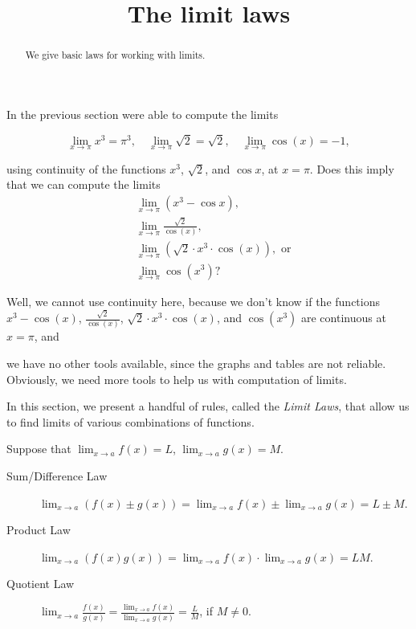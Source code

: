 \documentclass{ximera}
\title[Dig-In:]{The limit laws}
\begin{document}
\begin{abstract}
We give basic laws for working with limits. 
\end{abstract}
\maketitle
In the previous section were able to compute the limits

\[
\lim_{x\to \pi} x^3=\pi^3,\quad\lim_{x\to \pi} \sqrt{2}=\sqrt{2},\quad\lim_{x\to \pi} \cos(x)= -1,
\]

using continuity of the functions $x^3$, $\sqrt{2}$, and $\cos{x}$, at
$x=\pi$.  Does this imply that we can compute the limits
\begin{align*}
  &\lim_{x\to \pi} (x^3-\cos{x}),\\
  &\lim_{x\to \pi} \frac{\sqrt{2}}{\cos(x)},\\
  &\lim_{x\to \pi} (\sqrt{2}\cdot x^3\cdot\cos(x)), \text{ or}\\
  &\lim_{x\to \pi} \cos({x^3})?
\end{align*}

Well, we cannot use continuity here, because we don't know if the
functions $x^3-\cos(x)$, $\frac{\sqrt{2}}{\cos(x)}$, $\sqrt{2}\cdot
x^3\cdot\cos(x)$, and $\cos({x^3})$ are continuous at $x=\pi$, and

 we have no other tools available, since the graphs and tables are not reliable. Obviously, we need more tools to help us with computation of limits.

 

In this section, we present a handful of rules, called the \textit{Limit Laws},
that allow us to find limits of various combinations of functions.

\begin{theorem}\label{theorem:limit-laws}
Suppose that $\lim_{x\to a}f(x)=L$, $\lim_{x\to a}g(x)=M$.
\begin{description}
\item[Sum/Difference Law] $\lim_{x\to a} (f(x) \pm g(x)) =
  \lim_{x\to a}f(x) \pm \lim_{x\to a}g(x)=L \pm M$.
\item[Product Law]  $\lim_{x\to a} (f(x)g(x)) = \lim_{x\to
  a}f(x)\cdot\lim_{x\to a}g(x)=LM$.
\item[Quotient Law]  $\lim_{x\to a} \frac{f(x)}{g(x)} =
  \frac{\lim_{x\to a}f(x)}{\lim_{x\to a}g(x)}=\frac{L}{M}$, if
  $M\ne0$.
\end{description}
\label{thm:limit laws}
\end{theorem}
\end{document}
